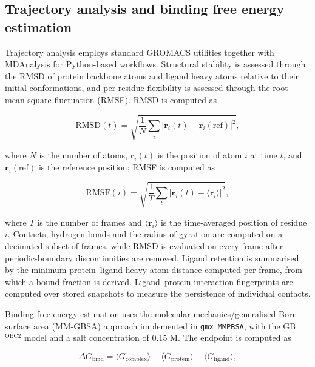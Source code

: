 \subsection{Trajectory analysis and binding free energy estimation}

Trajectory analysis employs standard GROMACS utilities together with MDAnalysis\cite{MichaudAgrawal2011} for Python-based workflows. Structural stability is assessed through the RMSD of protein backbone atoms and ligand heavy atoms relative to their initial conformations, and per-residue flexibility is assessed through the root-mean-square fluctuation (RMSF). RMSD is computed as

\begin{equation}
\mathrm{RMSD}(t) = \sqrt{ \frac{1}{N} \sum_{i} \left| \mathbf{r}_{i}(t) - \mathbf{r}_{i}(\mathrm{ref}) \right|^{2} },
\end{equation}

where $N$ is the number of atoms, $\mathbf{r}_{i}(t)$ is the position of atom $i$ at time $t$, and $\mathbf{r}_{i}(\mathrm{ref})$ is the reference position; RMSF is computed as

\begin{equation}
\mathrm{RMSF}(i) = \sqrt{ \frac{1}{T} \sum_{t} \left| \mathbf{r}_{i}(t) - \langle \mathbf{r}_{i} \rangle \right|^{2} },
\end{equation}

where $T$ is the number of frames and $\langle \mathbf{r}_{i} \rangle$ is the time-averaged position of residue $i$. Contacts, hydrogen bonds and the radius of gyration are computed on a decimated subset of frames, while RMSD is evaluated on every frame after periodic-boundary discontinuities are removed. Ligand retention is summarised by the minimum protein--ligand heavy-atom distance computed per frame, from which a bound fraction is derived. Ligand--protein interaction fingerprints are computed over stored snapshots to measure the persistence of individual contacts.

Binding free energy estimation uses the molecular mechanics/generalised Born surface area (MM-GBSA) approach implemented in \texttt{gmx\_MMPBSA}\cite{ValdesTresanco2021}, with the GB$^{\mathrm{OBC2}}$ model and a salt concentration of \num{0.15} M. The endpoint is computed as

\begin{equation}
\Delta G_{\mathrm{bind}} = \langle G_{\mathrm{complex}} \rangle - \langle G_{\mathrm{protein}} \rangle - \langle G_{\mathrm{ligand}} \rangle,
\end{equation}

